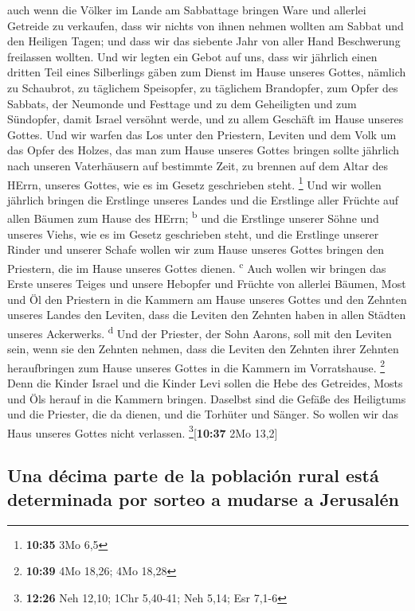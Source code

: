  auch wenn die Völker im Lande am Sabbattage bringen Ware
und allerlei Getreide zu verkaufen, dass wir nichts von ihnen nehmen
wollten am Sabbat und den Heiligen Tagen; und dass wir das siebente Jahr
von aller Hand Beschwerung freilassen wollten.  Und wir
legten ein Gebot auf uns, dass wir jährlich einen dritten Teil eines
Silberlings gäben zum Dienst im Hause unseres Gottes, 
nämlich zu Schaubrot, zu täglichem Speisopfer, zu täglichem Brandopfer,
zum Opfer des Sabbats, der Neumonde und Festtage und zu dem Geheiligten
und zum Sündopfer, damit Israel versöhnt werde, und zu allem Geschäft im
Hause unseres Gottes.  Und wir warfen das Los unter den
Priestern, Leviten und dem Volk um das Opfer des Holzes, das man zum
Hause unseres Gottes bringen sollte jährlich nach unseren Vaterhäusern
auf bestimmte Zeit, zu brennen auf dem Altar des HErrn, unseres Gottes,
wie es im Gesetz geschrieben steht. \footnote{\textbf{10:35} 3Mo 6,5}
 Und wir wollen jährlich bringen die Erstlinge unseres
Landes und die Erstlinge aller Früchte auf allen Bäumen zum Hause des
HErrn; \textsuperscript{b}  und die Erstlinge unserer
Söhne und unseres Viehs, wie es im Gesetz geschrieben steht, und die
Erstlinge unserer Rinder und unserer Schafe wollen wir zum Hause unseres
Gottes bringen den Priestern, die im Hause unseres Gottes dienen.
\textsuperscript{c}  Auch wollen wir bringen das Erste
unseres Teiges und unsere Hebopfer und Früchte von allerlei Bäumen, Most
und Öl den Priestern in die Kammern am Hause unseres Gottes und den
Zehnten unseres Landes den Leviten, dass die Leviten den Zehnten haben
in allen Städten unseres Ackerwerks. \textsuperscript{d} 
Und der Priester, der Sohn Aarons, soll mit den Leviten sein, wenn sie
den Zehnten nehmen, dass die Leviten den Zehnten ihrer Zehnten
heraufbringen zum Hause unseres Gottes in die Kammern im Vorratshause.
\footnote{\textbf{10:39} 4Mo 18,26; 4Mo 18,28}  Denn die
Kinder Israel und die Kinder Levi sollen die Hebe des Getreides, Mosts
und Öls herauf in die Kammern bringen. Daselbst sind die Gefäße des
Heiligtums und die Priester, die da dienen, und die Torhüter und Sänger.
So wollen wir das Haus unseres Gottes nicht verlassen.
\footnote{\textbf{12:26} Neh 12,10; 1Chr 5,40-41; Neh 5,14; Esr 7,1-6}{[}\textbf{10:37}
2Mo 13,2{]}

\hypertarget{una-duxe9cima-parte-de-la-poblaciuxf3n-rural-estuxe1-determinada-por-sorteo-a-mudarse-a-jerusaluxe9n}{%
\subsection{Una décima parte de la población rural está determinada por
sorteo a mudarse a
Jerusalén}\label{una-duxe9cima-parte-de-la-poblaciuxf3n-rural-estuxe1-determinada-por-sorteo-a-mudarse-a-jerusaluxe9n}}

